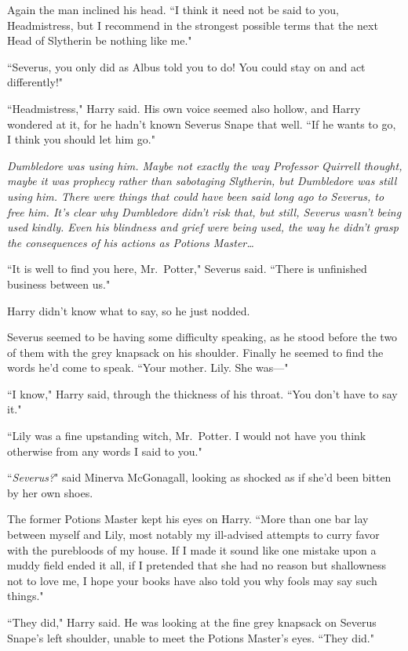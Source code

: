 Again the man inclined his head. ``I think it need not be said to you, Headmistress, but I recommend in the strongest possible terms that the next Head of Slytherin be nothing like me."

``Severus, you only did as Albus told you to do! You could stay on and act differently!"

``Headmistress," Harry said. His own voice seemed also hollow, and Harry wondered at it, for he hadn't known Severus Snape that well. ``If he wants to go, I think you should let him go."

\emph{Dumbledore was using him. Maybe not exactly the way Professor Quirrell thought, maybe it was prophecy rather than sabotaging Slytherin, but Dumbledore was still using him. There were things that could have been said long ago to Severus, to free him. It's clear why Dumbledore didn't risk that, but still, Severus wasn't being used kindly. Even his blindness and grief were being used, the way he didn't grasp the consequences of his actions as Potions Master{\ldots}}

``It is well to find you here, Mr.~Potter," Severus said. ``There is unfinished business between us."

Harry didn't know what to say, so he just nodded.

Severus seemed to be having some difficulty speaking, as he stood before the two of them with the grey knapsack on his shoulder. Finally he seemed to find the words he'd come to speak. ``Your mother. Lily. She was---"

``I know," Harry said, through the thickness of his throat. ``You don't have to say it."

``Lily was a fine upstanding witch, Mr.~Potter. I would not have you think otherwise from any words I said to you."

``\emph{Severus?}" said Minerva McGonagall, looking as shocked as if she'd been bitten by her own shoes.

The former Potions Master kept his eyes on Harry. ``More than one bar lay between myself and Lily, most notably my ill-advised attempts to curry favor with the purebloods of my house. If I made it sound like one mistake upon a muddy field ended it all, if I pretended that she had no reason but shallowness not to love me, I hope your books have also told you why fools may say such things."

``They did," Harry said. He was looking at the fine grey knapsack on Severus Snape's left shoulder, unable to meet the Potions Master's eyes. ``They did."

